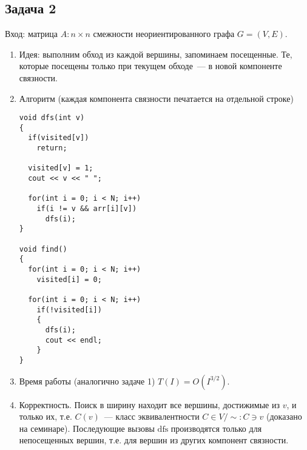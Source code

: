 \documentclass[a4paper]{article}
\begin{document}
\subsection*{Задача 2}
Вход: матрица $A\colon n\times n$ смежности неориентированного графа $G=(V,E)$.
\begin{enumerate}
\item Идея: выполним обход из каждой вершины, запоминаем посещенные. Те, которые посещены только при текущем обходе~--- в новой компоненте связности.
\item Алгоритм (каждая компонента связности печатается на отдельной строке)
\begin{lstlisting}
void dfs(int v)
{
  if(visited[v])
    return;

  visited[v] = 1;
  cout << v << " ";

  for(int i = 0; i < N; i++)
    if(i != v && arr[i][v])
      dfs(i);
}

void find()
{
  for(int i = 0; i < N; i++)
    visited[i] = 0;

  for(int i = 0; i < N; i++)
    if(!visited[i])
    {
      dfs(i);
      cout << endl;
    }
}
\end{lstlisting}
\item Время работы (аналогично задаче 1) $T(I)=O(I^{3/2})$.
\item Корректность. Поиск в ширину находит все вершины, достижимые из $v$, и только их, т.е. $C(v)$~--- класс эквивалентности $C\in V/\sim\colon C\ni v$ (доказано на семинаре). Последующие вызовы $\mbox{dfs}$ производятся только для непосещенных вершин, т.е. для вершин из других компонент связности.
\end{enumerate}
\end{document}
